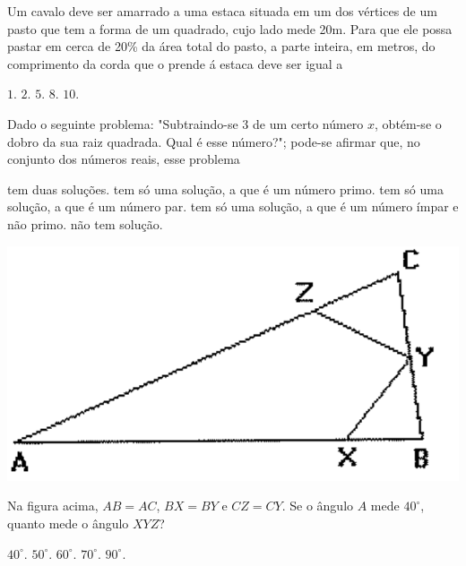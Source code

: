 \begin{question}%
Um cavalo deve ser amarrado a uma estaca situada em um dos vértices de um pasto que tem a forma de um quadrado, cujo lado mede 20m. Para que ele possa pastar em cerca de 20\% da área total do pasto, a parte inteira, em metros, do comprimento da corda que o prende á estaca deve ser igual a
    \begin{tasks}
        \task \(1\).
        \task \(2\).
        \task \(5\).
        \task \(8\).
        \task \(10\).
    \end{tasks}
\end{question}

\begin{question}%
Dado o seguinte problema: "Subtraindo-se \(3\) de um certo número \(x\), obtém-se o dobro da sua raiz quadrada. Qual é esse número?"; pode-se afirmar que, no conjunto dos números reais, esse problema
    \begin{tasks}
        \task tem duas soluções.
        \task tem só uma solução, a que é um número primo.
        \task tem só uma solução, a que é um número par.
        \task tem só uma solução, a que é um número ímpar e não primo.
        \task não tem solução.
    \end{tasks}
\end{question}

\begin{question}%

    \includegraphics[width=.3\textwidth]{CONCURSO/EAM/IMAGES/2005/EAM200503IMG.png}


Na figura acima, \(AB = AC\), \(BX = BY\) e \(CZ = CY\). Se o ângulo \(A\) mede \(40^\circ\), quanto mede o ângulo \(XYZ\)?
    \begin{tasks}
        \task \(40^\circ\).
        \task \(50^\circ\).
        \task \(60^\circ\).
        \task \(70^\circ\).
        \task \(90^\circ\).
    \end{tasks}
\end{question}

